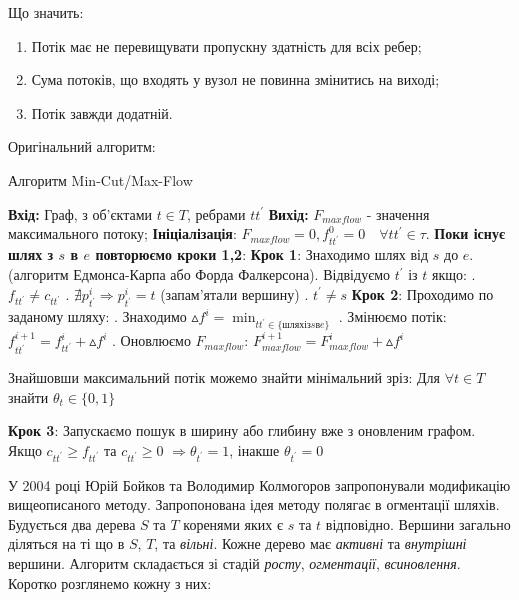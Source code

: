 Що значить:
\begin{enumerate}
    \item Потік має не перевищувати пропускну здатність для всіх ребер;
    \item Сума потоків, що входять у вузол не повинна змінитись на виході;
    \item Потік завжди додатній.
\end{enumerate}

Оригінальний алгоритм:

\begin{algorithm}
    \caption{Алгоритм Min-Cut/Max-Flow}
    \begin{algorithmic}
    \State \textbf{Вхід:} Граф, з об'єктами $t \in T$, ребрами $tt^{'}$
    \State \textbf{Вихід:} $F_{maxflow}$ - значення максимального потоку;
    \State \textbf{Ініціалізація}: $F_{maxflow} = 0, f_{tt^{'}}^{0} = 0 \quad  \forall tt^{'}  \in \tau$.
    \State \textbf{Поки існує шлях з $s$ в $e$ повторюємо кроки 1,2}:    
    \State \textbf{Крок 1}: Знаходимо шлях від $s$ до $e$.
    (алгоритм Едмонса-Карпа або Форда Фалкерсона).
    \State Відвідуємо $t^{'}$ із $t$ якщо:
            \State {}. $f_{tt^{'}} \neq   c_{tt^{'}}$
            \State {}. $ \nexists p_{t^{'}}^{i} \Rightarrow  p_{t^{'}}^{i} = t $ (запам'ятали вершину)
            \State {}. $ t^{'} \neq s $
    \State \textbf{Крок 2}: Проходимо по заданому шляху: 
            \State {}. Знаходимо $ \vartriangle f^{i} = \min_{tt^{'} \in \{шлях із s в e \}} $
            \State {}. Змінюємо потік: $ f_{tt^{'}}^{i+1} = f_{tt^{'}}^{i} + \vartriangle f^{i} $
            \State {}. Оновлюємо $F_{maxflow}$: $ F_{maxflow}^{i+1}  = F_{maxflow}^{i} + \vartriangle f^{i} $ 
    \end{algorithmic}

Знайшовши максимальний потік можемо знайти мінімальний зріз:
Для $\forall t \in T$ знайти $\theta_{t} \in \{0,1\}$
    \begin{algorithmic}
    \State \textbf{Крок 3}: Запускаємо пошук в ширину або глибину вже з оновленим графом.   
    \State \qquad Якщо $c_{tt^{'}} \geqslant f_{tt^{'}}$ та $c_{tt^{'}} \geqslant 0$
    $\Rightarrow \theta_{t^{'}} = 1 $, інакше $\theta_{t^{'}} = 0 $
    \end{algorithmic}
\end{algorithm}

У 2004 році Юрій Бойков та Володимир Колмогоров запропонували модификацію вищеописаного
методу.
Запропонована ідея методу полягає в огментації шляхів. Будується два дерева $S$ та $T$
коренями яких є $s$ та $t$ відповідно. Вершини загально діляться на ті що в $S$, $T$, та 
\textit{вільні}. Кожне дерево має \textit{активні} та \textit{внутрішні} вершини.
Алгоритм складається зі стадій \textit{росту}, \textit{огментації}, \textit{всиновлення}.\\
Коротко розглянемо кожну з них:

